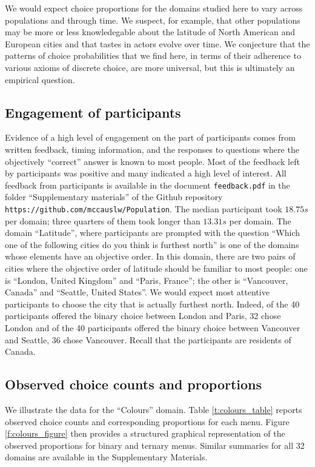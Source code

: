 \documentclass[11pt,letter]{article}
\newcommand{\menu}{menu}
\newcommand{\menus}{menus}
\begin{document}
We would expect choice proportions for the domains studied here to vary across populations and through time.
We suspect, for example, that other populations may be more or less knowledegable about the latitude of North American and European cities and that tastes in actors evolve over time.
We conjecture that the patterns of choice probabilities that we find here, in terms of their adherence to various axioms of discrete choice, are more universal, but this is ultimately an empirical question.

\subsection{Engagement of participants}

Evidence of a high level of engagement on the part of participants comes from written feedback, timing information, and the responses to questions where the objectively ``correct'' answer is known to most people.
Most of the feedback left by participants was positive and many indicated a high level of interest.
All feedback from participants is available in the document \texttt{feedback.pdf} in the folder ``Supplementary materials'' of the Github repository \texttt{https://github.com/mccauslw/Population}.
The median participant took $18.75s$ per domain; three quarters of them took longer than $13.31s$ per domain.
The domain ``Latitude'', where participants are prompted with the question ``Which one of the following cities do you think is furthest north'' is one of the domains whose elements have an objective order.
In this domain, there are two pairs of cities where the objective order of latitude should be familiar to most people: one is ``London, United Kingdom'' and ``Paris, France''; the other is ``Vancouver, Canada'' and ``Seattle, United States''.
We would expect most attentive participants to choose the city that is actually furthest north.
Indeed, of the 40 participants offered the binary choice between London and Paris, 32 chose London and of the 40 participants offered the binary choice between Vancouver and Seattle, 36 chose Vancouver.
Recall that the participants are residents of Canada.

\subsection{Observed choice counts and proportions}

We illustrate the data for the ``Colours'' domain.
Table \ref{t:colours_table} reports observed choice counts and corresponding proportions for each \menu{}.
Figure \ref{f:colours_figure} then provides a structured graphical representation of the observed proportions for binary and ternary \menus{}.
Similar summaries for all 32 domains are available in the Supplementary Materials.
\end{document}
